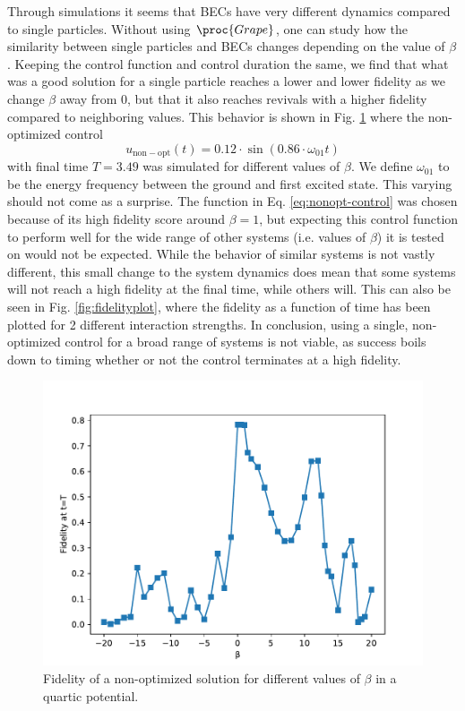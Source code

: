 \documentclass[a4paper, twocolumn]{revtex4-1}
\begin{document}
Through simulations it seems that BECs have very different dynamics compared to single particles. Without using $\proc{Grape}$, one can study how the similarity between single particles and BECs changes depending on the value of $\beta$. Keeping the control function and control duration the same, we find that what was a good solution for a single particle reaches a lower and lower fidelity as we change $\beta$ away from 0, but that it also reaches revivals with a higher fidelity compared to neighboring values. This behavior is shown in Fig. \ref{fig:beta} where the non-optimized control
\begin{equation}
	u_{\mathrm{non-opt}}(t)=0.12\cdot\sin(0.86\cdot \omega_{01} t)
	\label{eq:nonopt-control}
\end{equation} with final time $T=3.49$ was simulated for different values of $\beta$. We define $\omega_{01}$ to be the energy frequency between the ground and first excited state. This varying should not come as a surprise. The function in Eq. \eqref{eq:nonopt-control} was chosen because of its high fidelity score around $\beta=1$, but expecting this control function to perform well for the wide range of other systems (i.e. values of $\beta$) it is tested on would not be expected. While the behavior of similar systems is not vastly different, this small change to the system dynamics does mean that some systems will not reach a high fidelity at the final time, while others will. This can also be seen in Fig. \ref{fig:fidelityplot}, where the fidelity as a function of time has been plotted for 2 different interaction strengths. 
In conclusion, using a single, non-optimized control for a broad range of systems is not viable, as success boils down to timing whether or not the control terminates at a high fidelity.

\begin{figure}[h]
	\includegraphics[width=\columnwidth]{graphics/exploration/nonOptBeta.pdf}
	\caption{Fidelity of a non-optimized solution for different values of $\beta$ in a quartic potential.}
	\label{fig:beta}
\end{figure}
\end{document}
